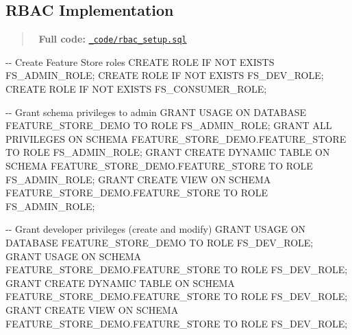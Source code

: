 \documentclass[
  letterpaper,
  DIV=11,
  numbers=noendperiod]{scrreprt}
\newenvironment{Shaded}{\begin{snugshade}}{\end{snugshade}}
\newcommand{\CommentTok}[1]{\textcolor[rgb]{0.37,0.37,0.37}{#1}}
\newcommand{\ControlFlowTok}[1]{\textcolor[rgb]{0.00,0.23,0.31}{#1}}
\newcommand{\KeywordTok}[1]{\textcolor[rgb]{0.00,0.23,0.31}{#1}}
\newcommand{\NormalTok}[1]{\textcolor[rgb]{0.00,0.23,0.31}{#1}}
\begin{document}
\hypertarget{rbac-implementation}{%
\subsection{RBAC Implementation}\label{rbac-implementation}}

\begin{quote}
📁 \textbf{Full code:}
\href{_code/rbac_setup.sql}{\texttt{\_code/rbac\_setup.sql}}
\end{quote}

\begin{Shaded}
\begin{Highlighting}[]
\CommentTok{{-}{-} Create Feature Store roles}
\KeywordTok{CREATE} \KeywordTok{ROLE} \ControlFlowTok{IF} \KeywordTok{NOT} \KeywordTok{EXISTS}\NormalTok{ FS\_ADMIN\_ROLE;}
\KeywordTok{CREATE} \KeywordTok{ROLE} \ControlFlowTok{IF} \KeywordTok{NOT} \KeywordTok{EXISTS}\NormalTok{ FS\_DEV\_ROLE;}
\KeywordTok{CREATE} \KeywordTok{ROLE} \ControlFlowTok{IF} \KeywordTok{NOT} \KeywordTok{EXISTS}\NormalTok{ FS\_CONSUMER\_ROLE;}

\CommentTok{{-}{-} Grant schema privileges to admin}
\KeywordTok{GRANT} \KeywordTok{USAGE} \KeywordTok{ON} \KeywordTok{DATABASE}\NormalTok{ FEATURE\_STORE\_DEMO }\KeywordTok{TO} \KeywordTok{ROLE}\NormalTok{ FS\_ADMIN\_ROLE;}
\KeywordTok{GRANT} \KeywordTok{ALL} \KeywordTok{PRIVILEGES} \KeywordTok{ON} \KeywordTok{SCHEMA}\NormalTok{ FEATURE\_STORE\_DEMO.FEATURE\_STORE }\KeywordTok{TO} \KeywordTok{ROLE}\NormalTok{ FS\_ADMIN\_ROLE;}
\KeywordTok{GRANT} \KeywordTok{CREATE} \KeywordTok{DYNAMIC} \KeywordTok{TABLE} \KeywordTok{ON} \KeywordTok{SCHEMA}\NormalTok{ FEATURE\_STORE\_DEMO.FEATURE\_STORE }\KeywordTok{TO} \KeywordTok{ROLE}\NormalTok{ FS\_ADMIN\_ROLE;}
\KeywordTok{GRANT} \KeywordTok{CREATE} \KeywordTok{VIEW} \KeywordTok{ON} \KeywordTok{SCHEMA}\NormalTok{ FEATURE\_STORE\_DEMO.FEATURE\_STORE }\KeywordTok{TO} \KeywordTok{ROLE}\NormalTok{ FS\_ADMIN\_ROLE;}

\CommentTok{{-}{-} Grant developer privileges (create and modify)}
\KeywordTok{GRANT} \KeywordTok{USAGE} \KeywordTok{ON} \KeywordTok{DATABASE}\NormalTok{ FEATURE\_STORE\_DEMO }\KeywordTok{TO} \KeywordTok{ROLE}\NormalTok{ FS\_DEV\_ROLE;}
\KeywordTok{GRANT} \KeywordTok{USAGE} \KeywordTok{ON} \KeywordTok{SCHEMA}\NormalTok{ FEATURE\_STORE\_DEMO.FEATURE\_STORE }\KeywordTok{TO} \KeywordTok{ROLE}\NormalTok{ FS\_DEV\_ROLE;}
\KeywordTok{GRANT} \KeywordTok{CREATE} \KeywordTok{DYNAMIC} \KeywordTok{TABLE} \KeywordTok{ON} \KeywordTok{SCHEMA}\NormalTok{ FEATURE\_STORE\_DEMO.FEATURE\_STORE }\KeywordTok{TO} \KeywordTok{ROLE}\NormalTok{ FS\_DEV\_ROLE;}
\KeywordTok{GRANT} \KeywordTok{CREATE} \KeywordTok{VIEW} \KeywordTok{ON} \KeywordTok{SCHEMA}\NormalTok{ FEATURE\_STORE\_DEMO.FEATURE\_STORE }\KeywordTok{TO} \KeywordTok{ROLE}\NormalTok{ FS\_DEV\_ROLE;}


\end{Highlighting}
\end{Shaded}
\end{document}
